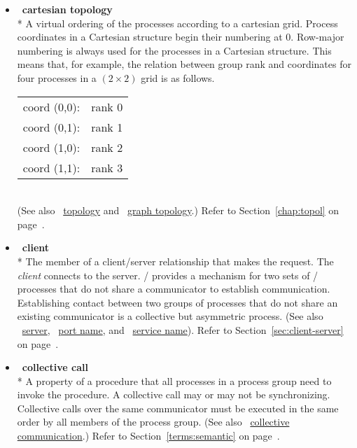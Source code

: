 \begin{itemize}
\label{glossary:cartesian_topology}
\item  ~\hypertarget{glossary:cartesian_topology}{\textbf{cartesian topology}} \\*
A virtual ordering of the processes according to a cartesian grid.
Process coordinates in a Cartesian structure begin their numbering at $0$.
Row-major numbering is always used for the processes in a
Cartesian structure. This means that, for example, the relation
between group rank and coordinates for four processes in
a $(2 \times 2)$ grid is as follows.\\[2.0ex]
\hspace*{\parindent}
\begin{tabular}{ll}
 coord (0,0): & rank 0 \\
 coord (0,1): & rank 1 \\
 coord (1,0): & rank 2 \\
 coord (1,1): & rank 3 \\
\end{tabular} \\
(See also ~\hyperlink{glossary:topology}{topology} and ~\hyperlink{glossary:graph_topology}{graph topology}.)
Refer to Section~\ref{chap:topol} on page~\pageref{chap:topol}.

\label{glossary:client}
\item  ~\hypertarget{glossary:client}{\textbf{client}} \\*
The member of a client/server relationship that makes the request. The \emph{client} connects to the server.
 \MPI/ provides a mechanism for two sets of \MPI/  processes that do not share a communicator
to establish communication.
Establishing contact between two groups of processes that do not share an
existing communicator is a collective but asymmetric process.  
(See also ~\hyperlink{glossary:server}{server},  ~\hyperlink{glossary:port_name}{port name},
and ~\hyperlink{glossary:service_name}{service name}). 
Refer to Section~\ref{sec:client-server} on page~\pageref{sec:client-server}.

\label{glossary:collective call}
\item  ~\hypertarget{glossary:collective_call}{\textbf{collective call}} \\*
A property of a procedure that all processes in a process group need to invoke the procedure.  A
collective call may or may not be synchronizing.
Collective calls over the same communicator
must be executed in the same order by all members of the process
group.
(See also ~\hyperlink{glossary:collective_communication}{collective communication}.)
Refer to Section~\ref{terms:semantic} on page~\pageref{terms:semantic}.


\end{itemize}
